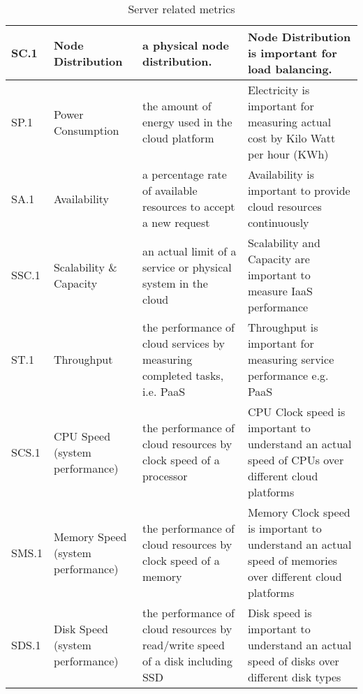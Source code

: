 \begin{table*}[P]
\caption{Server related metrics}
\begin{scriptsize}
\label{T:metrics}
\bigskip
\begin{center}
\begin{tabular}{lp{}p{}p{}}
\hline
SC.1 & 
Node Distribution & 
a physical node distribution. & 
Node Distribution is important for load balancing. \\
\hline
SP.1 &
Power Consumption&
the amount of energy used in the cloud platform  &
Electricity is important for measuring actual cost by Kilo Watt per hour (KWh) \\
\hline
SA.1 &
Availability&
a percentage rate of available resources to accept a new request &
Availability is important to provide cloud resources continuously \\
\hline
SSC.1 &
Scalability \& Capacity&
an actual limit of a service or physical system in the cloud &
Scalability and Capacity are important to measure IaaS performance \\
\hline
ST.1 &
Throughput &
the performance of cloud services by measuring completed tasks, i.e. PaaS &
Throughput is important for measuring service performance e.g. PaaS \\
\hline
SCS.1 &
CPU Speed (system performance)&
the performance of cloud resources by clock speed of a processor &
CPU Clock speed is important to understand an actual speed of CPUs over different cloud platforms \\
\hline
SMS.1 &
Memory Speed (system performance)&
the performance of cloud resources by clock speed of a memory &
Memory Clock speed is important to understand an actual speed of memories over different cloud platforms \\
\hline
SDS.1 &
Disk Speed (system performance)&
the performance of cloud resources by read/write speed of a disk including SSD &
Disk speed is important to understand an actual speed of disks over
                                                                                 different disk types \\
\hline
\end{tabular}
\end{center}
\end{scriptsize}
\end{table*}

